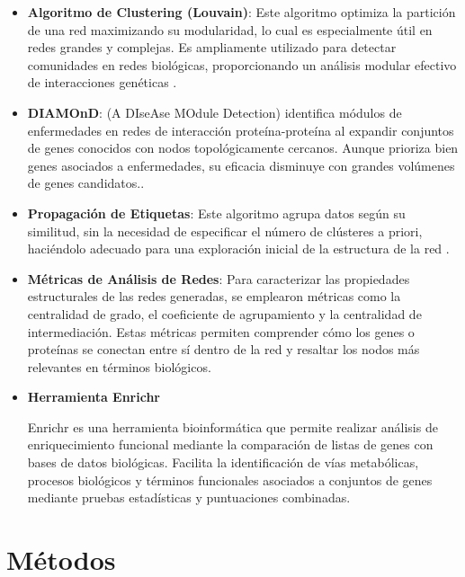 \begin{itemize}
	\item \textbf{Algoritmo de Clustering (Louvain)}: Este algoritmo optimiza la partición de una red maximizando su modularidad, lo cual es especialmente útil en redes grandes y complejas. Es ampliamente utilizado para detectar comunidades en redes biológicas, proporcionando un análisis modular efectivo de interacciones genéticas \cite{Blondel2008}.
	
	\item \textbf{DIAMOnD}: (A DIseAse MOdule Detection) identifica módulos de enfermedades en redes de interacción proteína-proteína al expandir conjuntos de genes conocidos con nodos topológicamente cercanos. Aunque prioriza bien genes asociados a enfermedades, su eficacia disminuye con grandes volúmenes de genes candidatos.\cite{Ghiassian2015}.
	
	\item \textbf{Propagación de Etiquetas}: Este algoritmo agrupa datos según su similitud, sin la necesidad de especificar el número de clústeres a priori, haciéndolo adecuado para una exploración inicial de la estructura de la red \cite{Raghavan2007}.
	
	\item \textbf{Métricas de Análisis de Redes}: Para caracterizar las propiedades estructurales de las redes generadas, se emplearon métricas como la centralidad de grado, el coeficiente de agrupamiento y la centralidad de intermediación. Estas métricas permiten comprender cómo los genes o proteínas se conectan entre sí dentro de la red y resaltar los nodos más relevantes en términos biológicos.
	
	\item \textbf{Herramienta Enrichr}
	
	Enrichr es una herramienta bioinformática que permite realizar análisis de enriquecimiento funcional mediante la comparación de listas de genes con bases de datos biológicas. Facilita la identificación de vías metabólicas, procesos biológicos y términos funcionales asociados a conjuntos de genes mediante pruebas estadísticas y puntuaciones combinadas.\cite{10.1093/nar/gkad393}
	
	
\end{itemize}



\section{Métodos}


